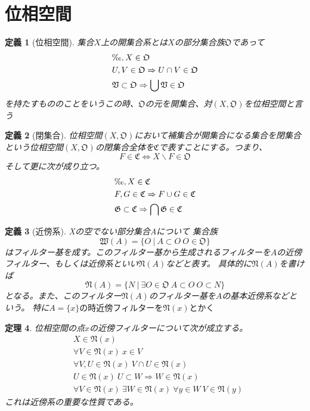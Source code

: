 \documentclass[leqno]{jsarticle}
\newtheorem{thm}{定理}
\newtheorem{df}[thm]{定義}
\begin{document}
\section{位相空間}
\begin{df}[位相空間]
集合$X$上の開集合系とは$X$の部分集合族$\mathfrak{O}$であって
\begin{align*}
&\O,X\in \mathfrak{O}\\
&U,V\in \mathfrak{O}\Rightarrow U\cap V\in \mathfrak{O}\\
&\mathfrak{V}\subset \mathfrak{O} \Rightarrow \bigcup \mathfrak{V}\in \mathfrak{O}
\end{align*}を持たすもののことをいうこの時、$\mathfrak{O}$の元を開集合、対$(X,\mathfrak{O})$を位相空間と言う
\end{df}
\begin{df}[閉集合]
位相空間$(X,\mathfrak{O})$において補集合が開集合になる集合を閉集合という位相空間$(X,\mathfrak{O})$の閉集合全体を$\mathfrak{C}$で表すことにする。つまり、
\[
F\in \mathfrak{C}\Leftrightarrow X\backslash F\in \mathfrak{O}
\]
そして更に次が成り立つ。
\begin{align*}
&\O,X\in \mathfrak{C}\\
&F,G\in \mathfrak{C}\Rightarrow F\cup G\in \mathfrak{C}\\
&\mathfrak{G}\subset \mathfrak{C} \Rightarrow \bigcap \mathfrak{G}\in \mathfrak{C}
\end{align*}
\end{df}
\begin{df}[近傍系]
Xの空でない部分集合Aについて
集合族\[\mathfrak{W}(A)=\{O\ |\ A\subset O\ O\in \mathfrak{O}\}\]はフィルター基を成す。このフィルター基から生成されるフィルターを$A$の近傍フィルター、もしくは近傍系といい$\mathfrak{N}(A)$などと表す。
具体的に$\mathfrak{N}(A)$を書けば
\[
\mathfrak{N}(A)=\{N\ |\ \exists O\in \mathfrak{O}\ A\subset O\ O\subset N\}
\]
となる。また、このフィルター$\mathfrak{N}(A)$のフィルター基を$A$の基本近傍系などという。
特に$A=\{x\}の時近傍フィルターを\mathfrak{N}(x)とかく$
\end{df}
\begin{thm}
位相空間の点$x$の近傍フィルターについて次が成立する。
\begin{align*}
&X\in \mathfrak{N}(x)\\
&\forall V\in \mathfrak{N}(x)\ x\in V\\
&\forall V,U\in \mathfrak{N}(x)\ V\cap U\in \mathfrak{N}(x)\\
&U\in \mathfrak{N}(x)\ U\subset W \Rightarrow W\in \mathfrak{N}(x)\\
&\forall V\in \mathfrak{N}(x)\ \exists W\in \mathfrak{N}(x)\ \forall y\in W\ V\in\mathfrak{N}(y)
\end{align*}これは近傍系の重要な性質である。
\end{thm}
\end{document}
